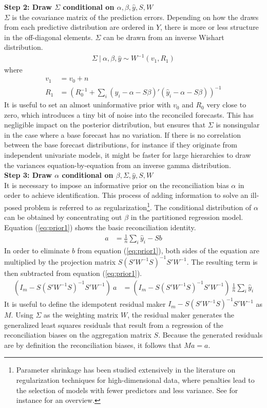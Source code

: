 \documentclass[a4paper,fleqn,11pt]{article}
\begin{document}
\noindent\textbf{Step 2: Draw $\Sigma$ conditional on $\alpha,\beta,\hat{y},S,W$}\\
$\Sigma$ is the covariance matrix of the prediction errors. Depending on how the draws from each predictive distribution are ordered in $Y$, there is more or less structure in the off-diagonal elements. $\Sigma$ can be drawn from an inverse Wishart distribution.
\begin{align}
\Sigma\ |\ \alpha,\beta,\hat{y} \sim W^{-1}(v_1,R_1)
\end{align}
where
\begin{align*}
v_1 &= v_0 + n\\
R_1 &=  \left( R_0^{-1} + \sum_i (\hat{y}_i - \alpha - S \beta)'(\hat{y}_i - \alpha - S \beta) \right)^{-1}
\end{align*}
It is useful to set an almost uninformative prior with $v_0$ and $R_0$ very close to zero, which introduces a tiny bit of noise into the reconciled forecasts. This has negligible impact on the posterior distribution, but ensures that $\Sigma$ is nonsingular in the case where a base forecast has no variation. If there is no correlation between the base forecast distributions, for instance if they originate from independent univariate models, it might be faster for large hierarchies to draw the variances equation-by-equation from an inverse gamma distribution.\\

\noindent\textbf{Step 3: Draw $\alpha$ conditional on $\beta,\Sigma,\hat{y},S,W$}\\
It is necessary to impose an informative prior on the reconciliation bias $\alpha$ in order to achieve identification. This process of adding information to solve an ill-posed problem is referred to as regularization\footnote{Parameter shrinkage  has been studied extensively in the literature on regularization techniques for high-dimensional data, where penalties lead to the selection of models with fewer predictors and less variance. See for instance \cite{Polson2010} for an overview.}. The conditional distribution of $\alpha$  can be obtained by concentrating out $\beta$ in the partitioned regression model. Equation (\ref{eq:prior1}) shows the basic reconciliation identity.
\begin{align}
	\label{eq:prior1}
	a &= \frac{1}{n}\sum_i \hat{y}_i - Sb
\end{align}
In order to eliminate $b$ from equation (\ref{eq:prior1}), both sides of the equation are multiplied by the projection matrix $S(S'W^{-1}S)^{-1}S'W^{-1}$. The resulting term is then subtracted from equation (\ref{eq:prior1}).
\begin{align}
	\label{eq:prior2}
	(I_m - S(S'W^{-1}S)^{-1}S'W^{-1})\ a &= (I_m - S(S'W^{-1}S)^{-1}S'W^{-1})\ \frac{1}{n}\sum_i \hat{y}_i  
\end{align}
It is useful to define the idempotent residual maker $I_m - S(S'W^{-1}S)^{-1}S'W^{-1}$ as $M$. Using $\Sigma$ as the weighting matrix $W$, the residual maker generates the generalized least squares residuals that result from a regression of the reconciliation biases on the aggregation matrix $S$. Because the generated residuals are by definition the reconciliation biases, it follows that $Ma = a$.
\end{document}
